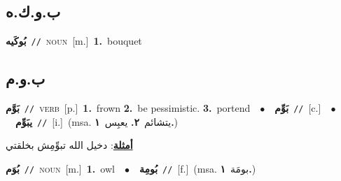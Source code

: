 \documentclass[10pt,a4paper,twoside]{article} %
\begin{document}
\begin{multicols}{2}
\vspace{-3mm}
\subsection*{\color{blue}\foreignlanguage{arabic}{ب.و.ك.ه}\color{blue}{ (ntws)}} 

{\setlength\topsep{0pt}\textbf{\foreignlanguage{arabic}{بُوكَيه}}\ {\color{gray}\texttt{//}\color{black}}\ \textsc{noun}\ [m.]\ \textbf{1.}~bouquet\ } \vspace{2mm}

\vspace{-3mm}
\subsection*{\color{blue}\foreignlanguage{arabic}{ب.و.م}\color{blue}{}} 

{\setlength\topsep{0pt}\textbf{\foreignlanguage{arabic}{بَوَّم}}\ {\color{gray}\texttt{//}\color{black}}\ \textsc{verb}\ [p.]\ \textbf{1.}~frown  \textbf{2.}~be pessimistic.  \textbf{3.}~portend\ \ $\bullet$\ \ \setlength\topsep{0pt}\textbf{\foreignlanguage{arabic}{بَوِّم}}\ {\color{gray}\texttt{//}\color{black}}\ [c.]\ \ $\bullet$\ \ \setlength\topsep{0pt}\textbf{\foreignlanguage{arabic}{يبَوِّم}}\ {\color{gray}\texttt{//}\color{black}}\ [i.]\ \color{gray}(msa. \foreignlanguage{arabic}{يتشائم}~\foreignlanguage{arabic}{\textbf{٢.}}  \foreignlanguage{arabic}{يعبِس}~\foreignlanguage{arabic}{\textbf{١.}})\color{black}\  \begin{flushright}\color{gray}\foreignlanguage{arabic}{\textbf{\underline{\foreignlanguage{arabic}{أمثلة}}}: دخيل الله تبوِّمِش بخلقتي}\end{flushright}\color{black}} \vspace{2mm}

{\setlength\topsep{0pt}\textbf{\foreignlanguage{arabic}{بُوَم}}\ {\color{gray}\texttt{//}\color{black}}\ \textsc{noun}\ [m.]\ \textbf{1.}~owl\ \ $\bullet$\ \ \setlength\topsep{0pt}\textbf{\foreignlanguage{arabic}{بُومِة}}\ {\color{gray}\texttt{//}\color{black}}\ [f.]\ \color{gray}(msa. \foreignlanguage{arabic}{بومَة}~\foreignlanguage{arabic}{\textbf{١.}})\color{black}\ } \vspace{2mm}


\end{multicols}
\end{document}
